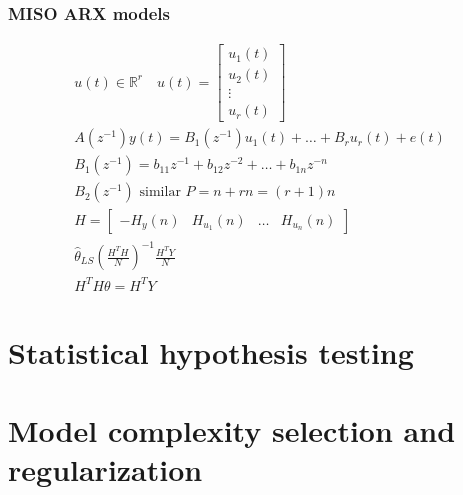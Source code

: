\documentclass{book}
\begin{document}
\subsection{MISO ARX models}
\begin{gather*}
    u(t) \in \mathbb{R}^r \quad u(t) = \begin{bmatrix}
        u_1(t) \\ u_2(t) \\ \vdots \\ u_r(t)
    \end{bmatrix}\\
    A(z^{-1})y(t) = B_1(z^{-1}) u_1(t) + \dots + B_r u_r(t) + e(t)\\
    B_1(z^{-1}) = b_{11}z^{-1} + b_{12}z^{-2} + \dots + b_{1n}z^{-n}\\
    B_2(z^{-1}) \text{ similar }
    P=n+rn=(r+1)n\\
    H=\begin{bmatrix}
        -H_y(n) & H_{u_1}(n) & \dots & H_{u_n}(n)
    \end{bmatrix}\\
    \hat{\theta}_{LS} \left( \displaystyle\frac{H^TH}{N} \right)^{-1}\displaystyle\frac{H^TY}{N}\\
    H^TH \theta = H^TY
\end{gather*}



































\chapter{Statistical hypothesis testing}

\chapter{Model complexity selection and regularization}
\end{document}
